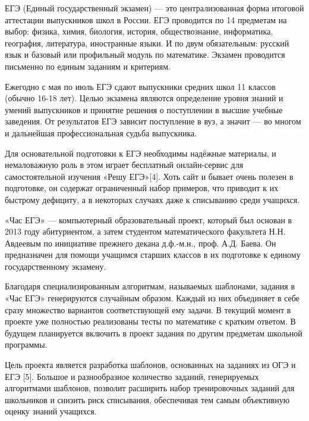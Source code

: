 ЕГЭ (Единый государственный экзамен) — это централизованная форма итоговой аттестации выпускников школ в России. ЕГЭ проводится по 14 предметам на выбор: физика, химия, биология, история, обществознание, информатика, география, литература, иностранные языки. И по двум обязательным: русский язык и базовый или профильный модуль по математике. Экзамен проводится письменно по единым заданиям и критериям. 

Ежегодно с мая по июль ЕГЭ сдают выпускники средних школ 11 классов (обычно 16-18 лет). Целью экзамена являются определение уровня знаний и умений выпускников и принятие решения о поступлении в высшие учебные заведения. От результатов ЕГЭ зависит поступление в вуз, а значит — во многом и дальнейшая профессиональная судьба выпускника.

Для основательной подготовки к ЕГЭ необходимы надёжные материалы, и немаловажную роль в этом играет бесплатный онлайн-сервис для самостоятельной изучения «Решу ЕГЭ»[4]. Хоть сайт и бывает очень полезен в подготовке, он содержат ограниченный набор примеров, что приводит к их быстрому дефициту, а в некоторых случаях даже к списыванию среди учащихся. 

«Час ЕГЭ» — компьютерный образовательный проект, который был основан в 2013 году абитуриентом, а затем студентом математического факультета Н.Н. Авдеевым по инициативе прежнего декана  д.ф.-м.н., проф. А.Д. Баева. Он предназначен для помощи учащимся старших классов в их подготовке к единому государственному экзамену.

Благодаря специализированным алгоритмам, называемых шаблонами, задания в «Час ЕГЭ» генерируются случайным образом. Каждый из них объединяет в себе сразу множество вариантов соответствующей ему задачи. В текущий момент в проекте уже полностью реализованы тесты по математике с кратким ответом. В будущем планируется включить в проект задания по другим предметам школьной программы. 

Цель проекта является разработка шаблонов, основанных на заданиях из ОГЭ и ЕГЭ [5]. Большое и разнообразное количество заданий, генерируемых алгоритмами шаблонов, позволит расширить набор тренировочных заданий для школьников и снизить риск списывания, обеспечивая тем самым объективную оценку знаний учащихся.